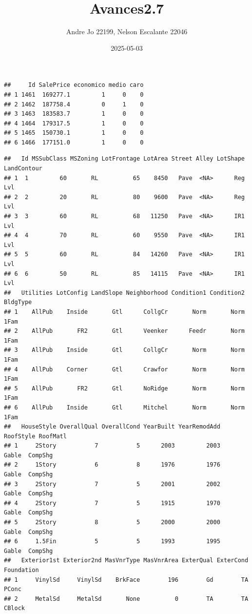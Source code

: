 \documentclass[
]{article}
\title{Avances2.7}
\author{Andre Jo 22199, Nelson Escalante 22046}
\date{2025-05-03}
\begin{document}
\maketitle

\begin{verbatim}
##     Id SalePrice economico medio caro
## 1 1461  169277.1         1     0    0
## 2 1462  187758.4         0     1    0
## 3 1463  183583.7         1     0    0
## 4 1464  179317.5         1     0    0
## 5 1465  150730.1         1     0    0
## 6 1466  177151.0         1     0    0
\end{verbatim}

\begin{verbatim}
##   Id MSSubClass MSZoning LotFrontage LotArea Street Alley LotShape LandContour
## 1  1         60       RL          65    8450   Pave  <NA>      Reg         Lvl
## 2  2         20       RL          80    9600   Pave  <NA>      Reg         Lvl
## 3  3         60       RL          68   11250   Pave  <NA>      IR1         Lvl
## 4  4         70       RL          60    9550   Pave  <NA>      IR1         Lvl
## 5  5         60       RL          84   14260   Pave  <NA>      IR1         Lvl
## 6  6         50       RL          85   14115   Pave  <NA>      IR1         Lvl
##   Utilities LotConfig LandSlope Neighborhood Condition1 Condition2 BldgType
## 1    AllPub    Inside       Gtl      CollgCr       Norm       Norm     1Fam
## 2    AllPub       FR2       Gtl      Veenker      Feedr       Norm     1Fam
## 3    AllPub    Inside       Gtl      CollgCr       Norm       Norm     1Fam
## 4    AllPub    Corner       Gtl      Crawfor       Norm       Norm     1Fam
## 5    AllPub       FR2       Gtl      NoRidge       Norm       Norm     1Fam
## 6    AllPub    Inside       Gtl      Mitchel       Norm       Norm     1Fam
##   HouseStyle OverallQual OverallCond YearBuilt YearRemodAdd RoofStyle RoofMatl
## 1     2Story           7           5      2003         2003     Gable  CompShg
## 2     1Story           6           8      1976         1976     Gable  CompShg
## 3     2Story           7           5      2001         2002     Gable  CompShg
## 4     2Story           7           5      1915         1970     Gable  CompShg
## 5     2Story           8           5      2000         2000     Gable  CompShg
## 6     1.5Fin           5           5      1993         1995     Gable  CompShg
##   Exterior1st Exterior2nd MasVnrType MasVnrArea ExterQual ExterCond Foundation
## 1     VinylSd     VinylSd    BrkFace        196        Gd        TA      PConc
## 2     MetalSd     MetalSd       None          0        TA        TA     CBlock

\end{verbatim}
\end{document}
